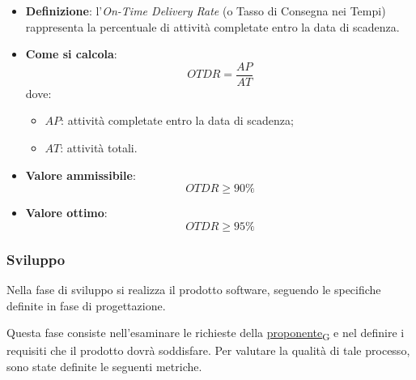 \hypertarget{10M}{}
\begin{itemize}
	\item \textbf{Definizione}: l'\textit{On-Time Delivery Rate} (o Tasso di Consegna nei Tempi) rappresenta la percentuale di attività completate entro la data di scadenza.
	\item \textbf{Come si calcola}: \begin{equation*}OTDR = \frac{AP}{AT}\end{equation*} dove:
		\begin{itemize}
			\item $AP$: attività completate entro la data di scadenza;
			\item $AT$: attività totali.
		\end{itemize}
	\item \textbf{Valore ammissibile}: \begin{equation*}OTDR \geq 90\%\end{equation*}
	\item \textbf{Valore ottimo}: \begin{equation*}OTDR \geq 95\%\end{equation*}
\end{itemize}



\subsubsection{Sviluppo}
Nella fase di sviluppo si realizza il prodotto software, seguendo le specifiche definite in fase di progettazione.

Questa fase consiste nell'esaminare le richieste della \href{https://7last.github.io/docs/rtb/documentazione-interna/glossario\#proponente}{proponente\textsubscript{G}} e nel definire i requisiti che il prodotto dovrà soddisfare. Per valutare la qualità di tale processo, sono state definite le seguenti metriche.

